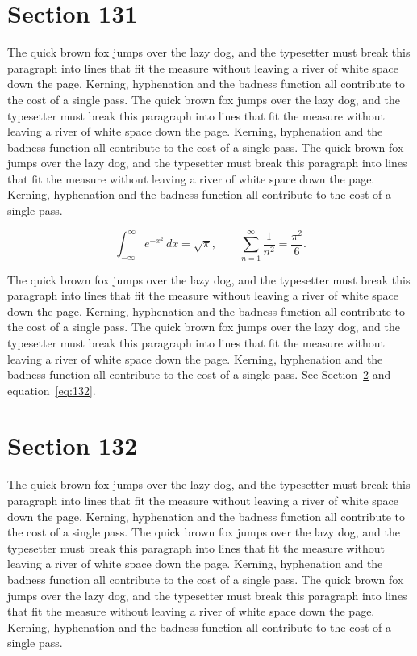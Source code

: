 \documentclass{article}
\begin{document}
\section{Section 131}
\label{sec:131}
The quick brown fox jumps over the lazy dog, and the typesetter must break this paragraph into lines that fit the measure without leaving a river of white space down the page. Kerning, hyphenation and the badness function all contribute to the cost of a single pass. The quick brown fox jumps over the lazy dog, and the typesetter must break this paragraph into lines that fit the measure without leaving a river of white space down the page. Kerning, hyphenation and the badness function all contribute to the cost of a single pass. The quick brown fox jumps over the lazy dog, and the typesetter must break this paragraph into lines that fit the measure without leaving a river of white space down the page. Kerning, hyphenation and the badness function all contribute to the cost of a single pass. 

\begin{equation}\label{eq:131}
\int_{-\infty}^{\infty} e^{-x^{2}}\,dx = \sqrt{\pi}, \qquad
\sum_{n=1}^{\infty} \frac{1}{n^{2}} = \frac{\pi^{2}}{6}.
\end{equation}

The quick brown fox jumps over the lazy dog, and the typesetter must break this paragraph into lines that fit the measure without leaving a river of white space down the page. Kerning, hyphenation and the badness function all contribute to the cost of a single pass. The quick brown fox jumps over the lazy dog, and the typesetter must break this paragraph into lines that fit the measure without leaving a river of white space down the page. Kerning, hyphenation and the badness function all contribute to the cost of a single pass. 
See Section~\ref{sec:132} and equation~\eqref{eq:132}.
\section{Section 132}
\label{sec:132}
The quick brown fox jumps over the lazy dog, and the typesetter must break this paragraph into lines that fit the measure without leaving a river of white space down the page. Kerning, hyphenation and the badness function all contribute to the cost of a single pass. The quick brown fox jumps over the lazy dog, and the typesetter must break this paragraph into lines that fit the measure without leaving a river of white space down the page. Kerning, hyphenation and the badness function all contribute to the cost of a single pass. The quick brown fox jumps over the lazy dog, and the typesetter must break this paragraph into lines that fit the measure without leaving a river of white space down the page. Kerning, hyphenation and the badness function all contribute to the cost of a single pass. 
\end{document}
